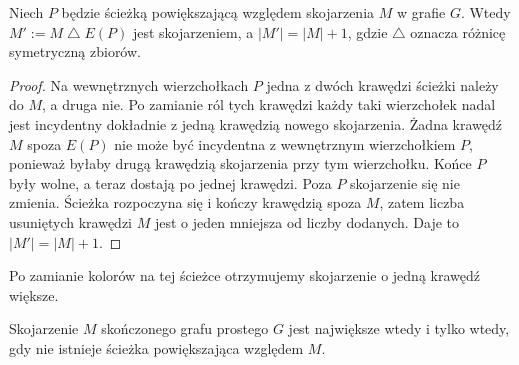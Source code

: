 \begin{lemat}
Niech $P$ będzie ścieżką powiększającą względem
skojarzenia $M$ w grafie $G$. Wtedy
$M':=M\mathbin{\triangle}E(P)$ jest skojarzeniem,
a $|M'|=|M|+1$, gdzie $\triangle$ oznacza różnicę
symetryczną zbiorów.
\end{lemat}

\begin{proof}
Na wewnętrznych wierzchołkach $P$ jedna z dwóch
krawędzi ścieżki należy do $M$, a druga nie.
Po zamianie ról tych krawędzi każdy taki wierzchołek
nadal jest incydentny dokładnie z jedną krawędzią
nowego skojarzenia. Żadna krawędź $M$ spoza $E(P)$
nie może być incydentna z wewnętrznym wierzchołkiem
$P$, ponieważ byłaby drugą krawędzią skojarzenia
przy tym wierzchołku. Końce $P$ były wolne,
a teraz dostają po jednej krawędzi. Poza $P$
skojarzenie się nie zmienia. Ścieżka rozpoczyna się
i kończy krawędzią spoza $M$, zatem liczba usuniętych
krawędzi $M$ jest o jeden mniejsza od liczby dodanych.
Daje to $|M'|=|M|+1$.
\end{proof}

\begin{center}

{\footnotesize Po zamianie kolorów na tej ścieżce
otrzymujemy skojarzenie o jedną krawędź większe.}
\end{center}

\begin{twierdzenie}[Berge]
\label{thm:tg-berge}
Skojarzenie $M$ skończonego grafu prostego $G$
jest największe wtedy i tylko wtedy, gdy
nie istnieje ścieżka powiększająca względem $M$.
\end{twierdzenie}


